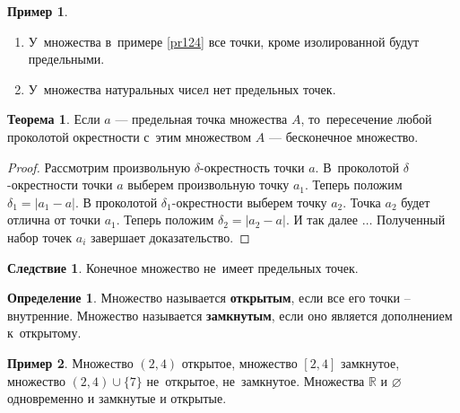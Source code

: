 \documentclass[pdftex, 12pt, a4paper]{article}
\def\R{\ensuremath{\mathbb{R}}} %
\def \dt{\delta}
\theoremstyle{definition} %
\newtheorem*{mydef}{Определение}
\newtheorem{myex}{Пример}
\newtheorem{myth}{Теорема}
\newtheorem{cor}{Следствие}
\numberwithin{problem}{section}
\newcommand{\indef}[1]{\textbf{#1}}
\numberwithin{blits}{section}
\begin{document}
\begin{myex}
\mbox{ }

\begin{enumerate}
\item У~множества в~примере \ref{pr124} все точки, кроме изолированной будут предельными.
\item У~множества натуральных чисел нет предельных точек.
\end{enumerate}
\end{myex}

\begin{myth} Если $a$ --- предельная точка множества $A$, то~пересечение любой проколотой окрестности с~этим множеством $A$ --- бесконечное множество.
\end{myth}
\begin{proof}
Рассмотрим произвольную $\dt$-окрестность точки $a$. В~проколотой $\dt$-окрестности точки $a$ выберем произвольную точку $a_1$. Теперь положим  $\dt_1=|a_1-a|$. В проколотой $\dt_1$-окрестности выберем точку $a_2$. Точка $a_2$ будет отлична от точки $a_1$. Теперь положим  $\dt_2=|a_2-a|$. И так далее $\ldots$ Полученный набор точек $a_i$ завершает доказательство.
\end{proof}

\begin{cor}Конечное множество не~имеет предельных точек.
\end{cor}

\begin{mydef} Множество называется \indef{открытым},   если все его точки – внутренние. Множество называется \indef{замкнутым},   если оно является дополнением к~открытому.
\end{mydef}

\begin{myex}
Множество $(2,4)$ открытое, множество $[2,4]$ замкнутое, множество $(2,4) \cup \{7\}$ не~открытое, не~замкнутое. Множества $\R$ и $\varnothing$ одновременно и замкнутые и открытые.
\end{myex}
\end{document}
